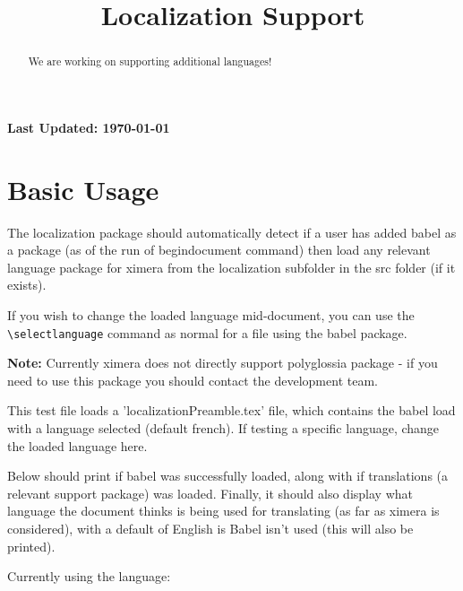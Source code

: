 \documentclass{ximera}
\title{Localization Support}
\begin{document}
\begin{abstract}%
    We are working on supporting additional languages!
\end{abstract}
\maketitle

{{\Huge \bfseries Last Updated: \today}} \\

\section{Basic Usage}

The localization package should automatically detect if a user has added babel as a package (as of the run of begin{document} command) 
then load any relevant language package for ximera from the localization subfolder in the src folder (if it exists). 

If you wish to change the loaded language mid-document, you can use the \verb|\selectlanguage| command as normal 
for a file using the babel package.

\textbf{Note:} Currently ximera does not directly support polyglossia package - if you need to use this package you should 
contact the development team.

This test file loads a 'localizationPreamble.tex' file, which contains the babel load with a language selected (default french).
If testing a specific language, change the loaded language here.

Below should print if babel was successfully loaded, along with if translations (a relevant support package) was loaded.
Finally, it should also display what language the document thinks is being used for translating (as far as ximera is considered),
with a default of English is Babel isn't used (this will also be printed).

\makeatletter
{}


Currently using the language:  %

\makeatother
\end{document}
